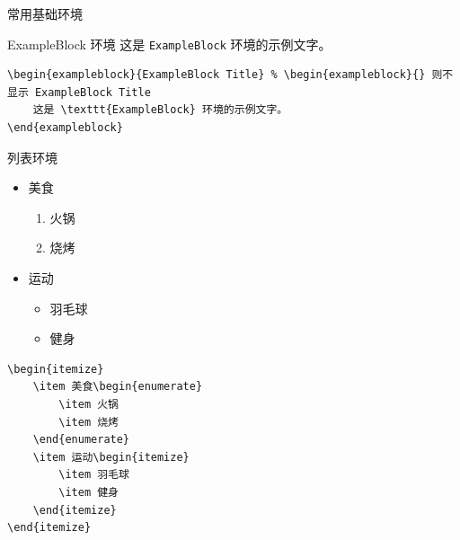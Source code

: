 \begin{frame}{常用基础环境}
	
\begin{exampleblock}{ExampleBlock 环境}
	这是 \texttt{ExampleBlock} 环境的示例文字。
\end{exampleblock}
\begin{lstlisting}
\begin{exampleblock}{ExampleBlock Title} % \begin{exampleblock}{} 则不显示 ExampleBlock Title
    这是 \texttt{ExampleBlock} 环境的示例文字。
\end{exampleblock}
\end{lstlisting}
\end{frame}


\begin{frame}{列表环境}
	\begin{minipage}[t]{0.43\linewidth}
		\begin{itemize}
			\item 美食\begin{enumerate}
				\item 火锅
				\item 烧烤
			\end{enumerate}
			\item 运动\begin{itemize}
				\item 羽毛球
				\item 健身
			\end{itemize}
		\end{itemize}
\begin{lstlisting}
\begin{itemize}
    \item 美食\begin{enumerate}
        \item 火锅
        \item 烧烤
    \end{enumerate}
    \item 运动\begin{itemize}
        \item 羽毛球
        \item 健身
    \end{itemize}
\end{itemize}
\end{lstlisting}
	\end{minipage}\hspace*{1.5cm}
	\begin{minipage}[t]{0.43\linewidth}
		\begin{enumerate}

\end{enumerate}
\end{minipage}
\end{frame}
